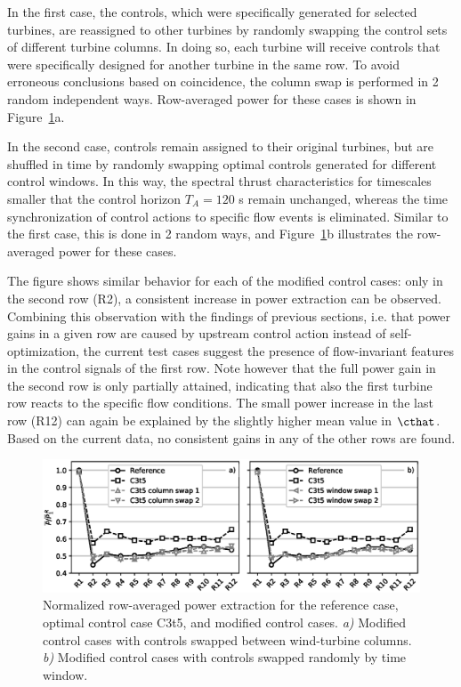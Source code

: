 	In the first case, the controls, which were specifically generated for selected turbines, are reassigned to other turbines by randomly swapping the control sets of different turbine columns. In doing so, each turbine will receive controls that were specifically designed for another turbine in the same row. To avoid erroneous conclusions based on coincidence, the column swap is performed in 2 random independent ways. Row-averaged power for these cases is shown in Figure~\ref{fig:scrambled}a. 
	
	In the second case, controls remain assigned to their original turbines, but are shuffled in time by randomly swapping optimal controls generated for different control windows. In this way, the spectral thrust characteristics for timescales smaller that the control horizon $T_A = 120$ s remain unchanged, whereas the time synchronization of control actions to specific flow events is eliminated. Similar to the first case, this is done in 2 random ways, and Figure~\ref{fig:scrambled}b illustrates the row-averaged power for these cases.

	The figure shows similar behavior for each of the modified control cases: only in the second row (R2), a consistent increase in power extraction can be observed. Combining this observation with the findings of previous sections, i.e. that power gains in a given row are caused by upstream control action instead of self-optimization, the current test cases suggest the presence of flow-invariant	features in the control signals of the first row. Note however that the full power gain in the second row is only partially attained, indicating that also the first turbine row reacts to the specific flow conditions. The small power increase in the last row (R12) can again be explained by the slightly higher mean value in $\cthat$. Based on the current data, no consistent gains in any of the other rows are found. 

	\begin{figure}
		\includegraphics[width=\textwidth]{chapters/analysis_induction_control/scrambled.eps}
		\caption[Normalized row-averaged power extraction for the reference case, optimal control case C3t5, and modified control cases.]{Normalized row-averaged power extraction for the reference case, optimal control case C3t5, and modified control cases. \emph{a)} Modified control cases with controls swapped between wind-turbine columns. \emph{b)} Modified control cases with controls swapped randomly by time window. \label{fig:scrambled}}
	\end{figure}

